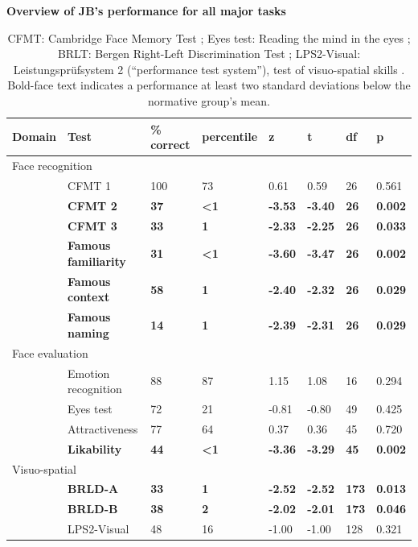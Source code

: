 \documentclass[fleqn,10pt]{SelfArx} %
\begin{document}
\begin{table}[htbp]
	\renewcommand{\familydefault}{\sfdefault}\normalfont\renewcommand{}
	\centering
	\caption{\bf Overview of JB's performance for all major tasks}
	\small
	\begin{tabular}{llllllll}
		\hline
			Domain & Test & \% correct & percentile & z & t & df & p \\
		\hline
		\multicolumn{2}{l}{Face recognition} \\
		& CFMT 1 &  100 &         73 &  0.61 &  0.59 &   26 &  0.561  \\
		& \textbf{CFMT 2} &    \textbf{37} &      \textbf{<1} & \textbf{-3.53} & \textbf{-3.40} &   \textbf{26} &  \textbf{0.002} \\
		& \textbf{CFMT 3} &    \textbf{33} &      \textbf{1} & \textbf{-2.33} & \textbf{-2.25} &   \textbf{26} &  \textbf{0.033}  \\
		& \textbf{Famous familiarity} &     \textbf{31} &      \textbf{<1} & \textbf{-3.60} & \textbf{-3.47} &   \textbf{26} &  \textbf{0.002} \\
		& \textbf{Famous context} &     \textbf{58} &        \textbf{1} & \textbf{-2.40} & \textbf{-2.32} &   \textbf{26} &  \textbf{0.029} \\
		& \textbf{Famous naming} &      \textbf{14} &        \textbf{1} & \textbf{-2.39} & \textbf{-2.31} &   \textbf{26} &  \textbf{0.029} \\
		\multicolumn{2}{l}{Face evaluation} \\
		& Emotion recognition &         88 &         87 &  1.15 &  1.08 &   16 &  0.294  \\
		& Eyes test &         72 &         21 & -0.81 & -0.80 &   49 &  0.425  \\
		& Attractiveness &         77 &         64 &  0.37 &  0.36 &   45 &  0.720 \\
		& \textbf{Likability} &         \textbf{44} &          \textbf{<1} & \textbf{-3.36} & \textbf{-3.29} &   \textbf{45} &  \textbf{0.002} \\
		\multicolumn{2}{l}{Visuo-spatial} \\
		& \textbf{BRLD-A} &         \textbf{33} &       \textbf{1} & \textbf{-2.52} & \textbf{-2.52} &  \textbf{173} &  \textbf{0.013} \\
		& \textbf{BRLD-B} &         \textbf{38} &       \textbf{2} & \textbf{-2.02} & \textbf{-2.01} &  \textbf{173} &  \textbf{0.046} \\
		& LPS2-Visual &         48 &         16 & -1.00 & -1.00 &  128 &  0.321 \\
		\hline
	\end{tabular}
	\parbox{12cm}{\caption*{CFMT: Cambridge Face Memory Test \citep{Duchaine_2006cfmt}; Eyes test: Reading the mind in the eyes \citep{Baron_Cohen_2001}; BRLT: Bergen Right-Left Discrimination Test \citep{Ofte_2002}; LPS2-Visual: Leistungsprüfsystem 2 (“performance test system”), test of visuo-spatial skills \citep{Horn}. Bold-face text indicates a performance at least two standard deviations below the normative group's mean.} }
	\label{tab:summary}
\end{table}
\end{document}
